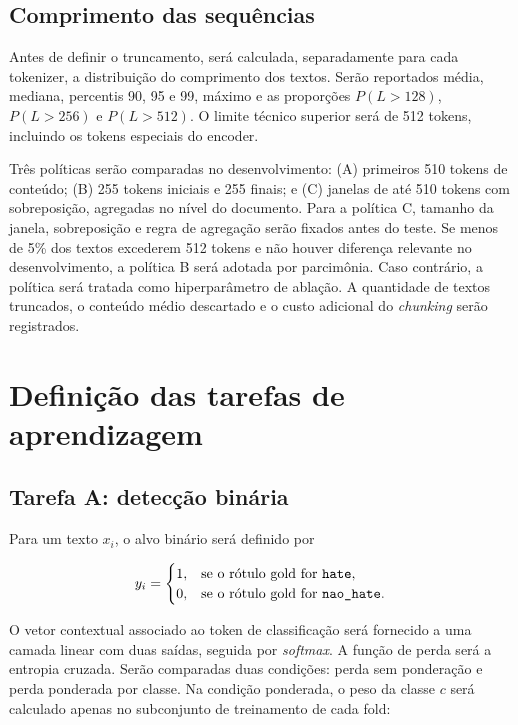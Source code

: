 \subsection{Comprimento das sequências}

Antes de definir o truncamento, será calculada, separadamente para cada tokenizer,
a distribuição do comprimento dos textos. Serão reportados média, mediana,
percentis 90, 95 e 99, máximo e as proporções $P(L>128)$, $P(L>256)$ e
$P(L>512)$. O limite técnico superior será de 512 tokens, incluindo os tokens
especiais do encoder.

Três políticas serão comparadas no desenvolvimento: (A) primeiros 510 tokens de
conteúdo; (B) 255 tokens iniciais e 255 finais; e (C) janelas de até 510 tokens
com sobreposição, agregadas no nível do documento. Para a política C, tamanho da
janela, sobreposição e regra de agregação serão fixados antes do teste. Se menos
de 5\% dos textos excederem 512 tokens e não houver diferença relevante no
desenvolvimento, a política B será adotada por parcimônia. Caso contrário, a
política será tratada como hiperparâmetro de ablação. A quantidade de textos
truncados, o conteúdo médio descartado e o custo adicional do \textit{chunking}
serão registrados.

\section{Definição das tarefas de aprendizagem}
\label{sec:tarefas-aprendizagem}

\subsection{Tarefa A: detecção binária}

Para um texto $x_i$, o alvo binário será definido por

\begin{equation}
    y_i =
    \begin{cases}
        1, & \text{se o rótulo gold for \texttt{hate}},\\
        0, & \text{se o rótulo gold for \texttt{nao\_hate}}.
    \end{cases}
\end{equation}

O vetor contextual associado ao token de classificação será fornecido a uma
camada linear com duas saídas, seguida por \textit{softmax}. A função de perda
será a entropia cruzada. Serão comparadas duas condições: perda sem ponderação e
perda ponderada por classe. Na condição ponderada, o peso da classe $c$ será
calculado apenas no subconjunto de treinamento de cada fold:

